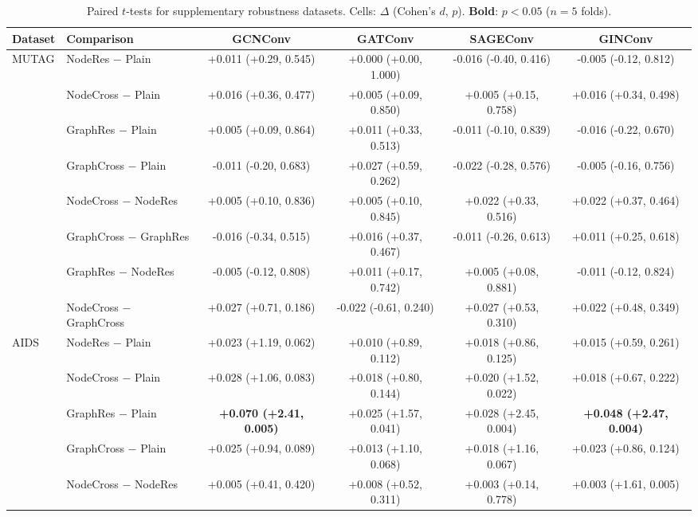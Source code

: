 \begin{table}[t]
\centering
\scriptsize
\setlength{\tabcolsep}{3pt}
\caption{Paired $t$-tests for supplementary robustness datasets. Cells: $\Delta$ (Cohen's $d$, $p$). \textbf{Bold}: $p<0.05$ ($n{=}5$ folds).}
\label{tab:statistical_tests_supp}
\begin{tabular}{llcccc}
\toprule
Dataset & Comparison & GCNConv & GATConv & SAGEConv & GINConv \\
\midrule
MUTAG & NodeRes $-$ Plain & +0.011 (+0.29, 0.545) & +0.000 (+0.00, 1.000) & -0.016 (-0.40, 0.416) & -0.005 (-0.12, 0.812) \\
 & NodeCross $-$ Plain & +0.016 (+0.36, 0.477) & +0.005 (+0.09, 0.850) & +0.005 (+0.15, 0.758) & +0.016 (+0.34, 0.498) \\
 & GraphRes $-$ Plain & +0.005 (+0.09, 0.864) & +0.011 (+0.33, 0.513) & -0.011 (-0.10, 0.839) & -0.016 (-0.22, 0.670) \\
 & GraphCross $-$ Plain & -0.011 (-0.20, 0.683) & +0.027 (+0.59, 0.262) & -0.022 (-0.28, 0.576) & -0.005 (-0.16, 0.756) \\
 & NodeCross $-$ NodeRes & +0.005 (+0.10, 0.836) & +0.005 (+0.10, 0.845) & +0.022 (+0.33, 0.516) & +0.022 (+0.37, 0.464) \\
 & GraphCross $-$ GraphRes & -0.016 (-0.34, 0.515) & +0.016 (+0.37, 0.467) & -0.011 (-0.26, 0.613) & +0.011 (+0.25, 0.618) \\
 & GraphRes $-$ NodeRes & -0.005 (-0.12, 0.808) & +0.011 (+0.17, 0.742) & +0.005 (+0.08, 0.881) & -0.011 (-0.12, 0.824) \\
 & NodeCross $-$ GraphCross & +0.027 (+0.71, 0.186) & -0.022 (-0.61, 0.240) & +0.027 (+0.53, 0.310) & +0.022 (+0.48, 0.349) \\
\midrule
AIDS & NodeRes $-$ Plain & +0.023 (+1.19, 0.062) & +0.010 (+0.89, 0.112) & +0.018 (+0.86, 0.125) & +0.015 (+0.59, 0.261) \\
 & NodeCross $-$ Plain & +0.028 (+1.06, 0.083) & +0.018 (+0.80, 0.144) & +0.020 (+1.52, 0.022) & +0.018 (+0.67, 0.222) \\
 & GraphRes $-$ Plain & \textbf{+0.070 (+2.41, 0.005)} & +0.025 (+1.57, 0.041) & +0.028 (+2.45, 0.004) & \textbf{+0.048 (+2.47, 0.004)} \\
 & GraphCross $-$ Plain & +0.025 (+0.94, 0.089) & +0.013 (+1.10, 0.068) & +0.018 (+1.16, 0.067) & +0.023 (+0.86, 0.124) \\
 & NodeCross $-$ NodeRes & +0.005 (+0.41, 0.420) & +0.008 (+0.52, 0.311) & +0.003 (+0.14, 0.778) & +0.003 (+1.61, 0.005) \\

\end{tabular}
\end{table}
